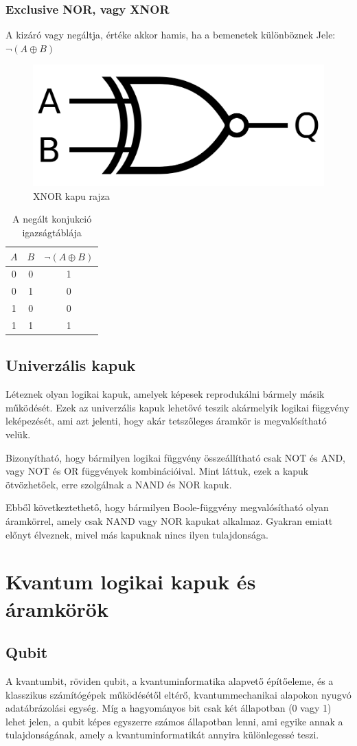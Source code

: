 \documentclass[
]{thesis-ekf}
\theoremstyle{definition}
\theoremstyle{remark}
\begin{document}
\subsubsection{Exclusive NOR, vagy XNOR}
A kizáró vagy negáltja, értéke akkor hamis, ha a bemenetek különböznek Jele: $\neg (A \oplus B)$

\begin{figure}[H]
	\centering
	\includegraphics[width=0.3\linewidth]{xnor}
	\caption{XNOR kapu rajza}
	\label{fig:xnor}
\end{figure}


\begin{table}[H]
	\centering
	\begin{tabular}{c|c|c}
		$A$ & $B$ & $\neg (A \oplus B)$\\               
		\hline
		0 & 0 & 1\\
		0 & 1 & 0\\
		1 & 0 & 0\\
		1 & 1 & 1
	\end{tabular}
	\caption{A negált konjukció igazságtáblája}
\end{table}

\subsection{Univerzális kapuk}
Léteznek olyan logikai kapuk, amelyek képesek reprodukálni bármely másik működését. Ezek az univerzális kapuk lehetővé teszik akármelyik logikai függvény leképezését, ami azt jelenti, hogy akár tetszőleges áramkör is megvalósítható velük.

Bizonyítható, hogy bármilyen logikai függvény összeállítható csak NOT és AND, vagy NOT és OR függvények kombinációival. Mint láttuk, ezek a kapuk ötvözhetőek, erre szolgálnak a NAND és NOR kapuk.

Ebből következtethető, hogy bármilyen Boole-függvény megvalósítható olyan áramkörrel, amely csak NAND vagy NOR kapukat alkalmaz. Gyakran emiatt előnyt élveznek, mivel más kapuknak nincs ilyen tulajdonsága.

\section{Kvantum logikai kapuk és áramkörök}
\subsection{Qubit}
A kvantumbit, röviden qubit, a kvantuminformatika alapvető építőeleme, és a klasszikus számítógépek működésétől eltérő, kvantummechanikai alapokon nyugvó adatábrázolási egység. Míg a hagyományos bit csak két állapotban (0 vagy 1) lehet jelen, a qubit képes egyszerre számos állapotban lenni, ami egyike annak a tulajdonságának, amely a kvantuminformatikát annyira különlegessé teszi.
\end{document}
